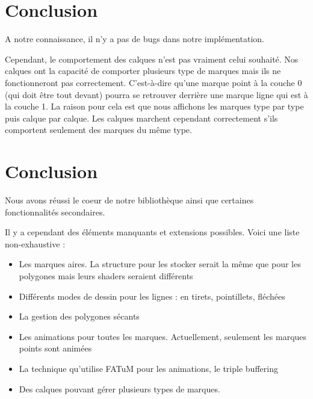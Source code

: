 \documentclass[12pt]{article}
\begin{document}
\section{Conclusion}

A notre connaissance, il n'y a pas de bugs dans notre implémentation.

Cependant, le comportement des calques n'est pas vraiment celui souhaité.
Nos calques ont la capacité de comporter plusieurs type de marques mais ils ne
fonctionneront pas correctement. C'est-à-dire qu'une marque point à la couche 0 (qui
doit être tout devant) pourra se retrouver derrière une marque ligne qui est à la couche 1.
La raison pour cela est que nous affichons les marques type par type puis calque par
calque.
Les  calques marchent cependant correctement s'ils comportent seulement des marques du même type.

\section{Conclusion}

Nous avons réussi le coeur de notre bibliothèque ainsi que certaines fonctionnalités
secondaires.

Il y a cependant des éléments manquants et extensions possibles.
Voici une liste non-exhaustive :

\begin{itemize}
\item Les marques aires. La structure pour les stocker serait la même que pour les
polygones mais leurs shaders seraient différents
\item Différents modes de dessin pour les lignes : en tirets, pointillets, fléchées
\item La gestion des polygones sécants
\item Les animations pour toutes les marques. Actuellement, seulement les marques points
sont animées
\item La technique qu'utilise FATuM pour les animations, le triple buffering
\item Des calques pouvant gérer plusieurs types de marques.
\end{itemize}

\printglossaries
\printbibliography
\end{document}
